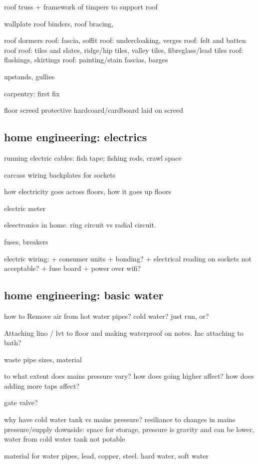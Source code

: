 roof truss
+ framework of timpers to support roof

wallplate
roof binders, roof bracing,

roof dormers
roof: fascia, soffit
roof: undercloaking, verges
roof: felt and batten roof
roof: tiles and slates, ridge/hip tiles, valley tiles, fibreglass/lead tiles
roof: flashings, skirtings
roof: painting/stain fascias, barges

upstands, gullies



carpentry: first fix

floor screed
protective hardcoard/cardboard laid on screed

\subsection{home engineering: electrics}
running electric cables: fish tape; fishing rods, crawl space

carcass wiring
backplates for sockets

how electricity goes across floors, how it goes up floors

electric meter

eleectronics in home. ring circuit vs radial circuit.

fuses, breakers

electric wiring:
+ consumer units
+ bonding?
+ electrical reading on sockets not acceptable?
+ fuse board
+ power over wifi?

\subsection{home engineering: basic water}
how to Remove air from hot water pipes? cold water? just run, or?

Attaching lino / lvt to floor and making waterproof on notes. Inc attaching to bath?

waste pipe sizes, material

to what extent does mains pressure vary? how does going higher affect? how does adding more taps affect?

gate valve?

why have cold water tank vs mains pressure? resiliance to changes in mains pressure/supply
downside: space for storage, pressure is gravity and can be lower, water from cold water tank not potable

material for water pipes, lead, copper, steel.
hard water, soft water

